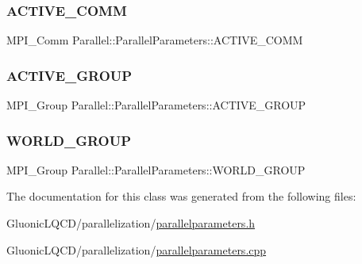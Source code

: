 \subsubsection{\texorpdfstring{ACTIVE\_COMM}{ACTIVE\_COMM}}
{\footnotesize\ttfamily M\+P\+I\+\_\+\+Comm Parallel\+::\+Parallel\+Parameters\+::\+A\+C\+T\+I\+V\+E\+\_\+\+C\+O\+MM\hspace{0.3cm}{\ttfamily [static]}}

\mbox{\label{class_parallel_1_1_parallel_parameters_a5cc87e4f375583de885186993ef234a4}} 
\subsubsection{\texorpdfstring{ACTIVE\_GROUP}{ACTIVE\_GROUP}}
{\footnotesize\ttfamily M\+P\+I\+\_\+\+Group Parallel\+::\+Parallel\+Parameters\+::\+A\+C\+T\+I\+V\+E\+\_\+\+G\+R\+O\+UP\hspace{0.3cm}{\ttfamily [static]}}

\mbox{\label{class_parallel_1_1_parallel_parameters_a8281c0a5cb7f2000ed42c56a30ca9ec8}} 
\subsubsection{\texorpdfstring{WORLD\_GROUP}{WORLD\_GROUP}}
{\footnotesize\ttfamily M\+P\+I\+\_\+\+Group Parallel\+::\+Parallel\+Parameters\+::\+W\+O\+R\+L\+D\+\_\+\+G\+R\+O\+UP\hspace{0.3cm}{\ttfamily [static]}}



The documentation for this class was generated from the following files\+:\begin{DoxyCompactItemize}
\item 
Gluonic\+L\+Q\+C\+D/parallelization/\mbox{\hyperlink{parallelparameters_8h}{parallelparameters.\+h}}\item 
Gluonic\+L\+Q\+C\+D/parallelization/\mbox{\hyperlink{parallelparameters_8cpp}{parallelparameters.\+cpp}}\end{DoxyCompactItemize}
